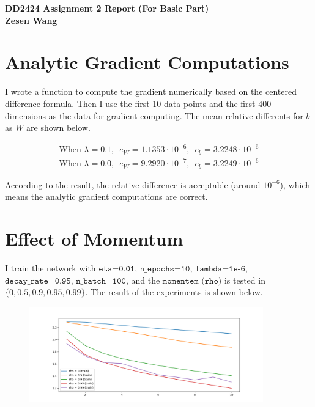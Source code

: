 

\usepackage{tikz}
\usepackage{graphicx}
\usepackage{amssymb}
\usepackage{amsmath}
\usepackage{harpoon}
\usepackage{float}
\usepackage{enumerate}
\usepackage{algorithm}
\usepackage{algpseudocode}
\usepackage{subcaption}
\usepackage{bm}
\usepackage{listings}

\usetikzlibrary{fit,positioning}


\begin{flushleft}

\bf{DD2424 Assignment 2 Report (For Basic Part)} \\
\bf{Zesen Wang} \\



\end{flushleft}


\section{Analytic Gradient Computations}
I wrote a function to compute the gradient numerically based on the centered difference formula. Then I use the first 10 data points and the first 400 dimensions as the data for gradient computing. The mean relative differents for $b$ as $W$ are shown below. 

\[
\begin{aligned}
	\text{When }\lambda=0.1,\,\,\,e_{W}=1.1353\cdot 10^{-6},\,\,\,e_{b}=3.2248\cdot 10^{-6}\\
	\text{When }\lambda=0.0,\,\,\,e_{W}=9.2920\cdot 10^{-7},\,\,\,e_{b}=3.2249\cdot 10^{-6}
\end{aligned}
\]

According to the result, the relative difference is acceptable (around $10^{-6}$), which means the analytic gradient computations are correct.

\section{Effect of Momentum}
I train the network with $\texttt{eta=0.01}$, $\texttt{n\_epochs=10}$, $\texttt{lambda=1e-6}$, $\texttt{decay\_rate=0.95}$, $\texttt{n\_batch=100}$, and the $\texttt{momentem (rho)}$ is tested in $\{0, 0.5, 0.9, 0.95, 0.99\}$. The result of the experiments is shown below.

\begin{figure}[h!]
	\centering
	\includegraphics[width=0.9\textwidth]{../Result_imgs/bestrho.png}
\end{figure}

